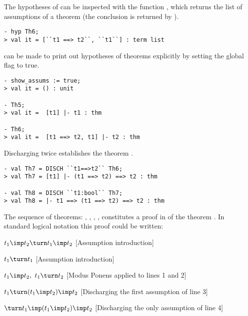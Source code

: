 The hypotheses of  can be inspected with the \ML{} function
, which returns the list of assumptions of a theorem (the
conclusion is returned by ).

\begin{session}
\begin{verbatim}
- hyp Th6;
> val it = [``t1 ==> t2``, ``t1``] : term list
\end{verbatim}
\end{session}

\HOL{} can be made to print out hypotheses of theorems explicitly by setting the global flag  to true.

\begin{session}
\begin{verbatim}
- show_assums := true;
> val it = () : unit

- Th5;
> val it =  [t1] |- t1 : thm

- Th6;
> val it =  [t1 ==> t2, t1] |- t2 : thm
\end{verbatim}
\end{session}


\noindent Discharging  twice establishes the theorem
.

\begin{session}
\begin{verbatim}
- val Th7 = DISCH ``t1==>t2`` Th6;
> val Th7 = [t1] |- (t1 ==> t2) ==> t2 : thm

- val Th8 = DISCH ``t1:bool`` Th7;
> val Th8 = |- t1 ==> (t1 ==> t2) ==> t2 : thm
\end{verbatim}
\end{session}

The sequence of theorems: , , , ,  constitutes a proof in \HOL{} of the theorem .
In standard logical notation this proof could be written:

\begin{proofenumerate}
\item $ t_1\imp t_2\turn t_1\imp t_2$ \hfill
[Assumption introduction]
\item $ t_1\turn t_1$ \hfill
[Assumption introduction]
\item $ t_1\imp t_2,\ t_1 \turn t_2 $ \hfill
[Modus Ponens applied to lines 1 and 2]
\item $ t_1 \turn (t_1\imp t_2)\imp t_2$ \hfill
[Discharging the first assumption of line 3]
\item $ \turn t_1 \imp (t_1 \imp t_2) \imp t_2$ \hfill
[Discharging the only assumption of line 4]
\end{proofenumerate}


